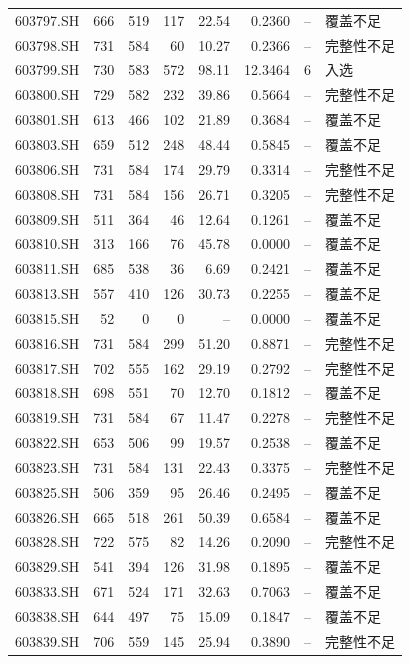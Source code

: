 \documentclass[10pt,a4paper]{article}
\begin{document}
\begin{longtable}{lrrr r r r l}
603797.SH & 666 & 519 & 117 & 22.54 & 0.2360 & -- & 覆盖不足\\
603798.SH & 731 & 584 & 60 & 10.27 & 0.2366 & -- & 完整性不足\\
603799.SH & 730 & 583 & 572 & 98.11 & 12.3464 & 6 & 入选\\
603800.SH & 729 & 582 & 232 & 39.86 & 0.5664 & -- & 完整性不足\\
603801.SH & 613 & 466 & 102 & 21.89 & 0.3684 & -- & 覆盖不足\\
603803.SH & 659 & 512 & 248 & 48.44 & 0.5845 & -- & 覆盖不足\\
603806.SH & 731 & 584 & 174 & 29.79 & 0.3314 & -- & 完整性不足\\
603808.SH & 731 & 584 & 156 & 26.71 & 0.3205 & -- & 完整性不足\\
603809.SH & 511 & 364 & 46 & 12.64 & 0.1261 & -- & 覆盖不足\\
603810.SH & 313 & 166 & 76 & 45.78 & 0.0000 & -- & 覆盖不足\\
603811.SH & 685 & 538 & 36 & 6.69 & 0.2421 & -- & 覆盖不足\\
603813.SH & 557 & 410 & 126 & 30.73 & 0.2255 & -- & 覆盖不足\\
603815.SH & 52 & 0 & 0 & -- & 0.0000 & -- & 覆盖不足\\
603816.SH & 731 & 584 & 299 & 51.20 & 0.8871 & -- & 完整性不足\\
603817.SH & 702 & 555 & 162 & 29.19 & 0.2792 & -- & 完整性不足\\
603818.SH & 698 & 551 & 70 & 12.70 & 0.1812 & -- & 覆盖不足\\
603819.SH & 731 & 584 & 67 & 11.47 & 0.2278 & -- & 完整性不足\\
603822.SH & 653 & 506 & 99 & 19.57 & 0.2538 & -- & 覆盖不足\\
603823.SH & 731 & 584 & 131 & 22.43 & 0.3375 & -- & 完整性不足\\
603825.SH & 506 & 359 & 95 & 26.46 & 0.2495 & -- & 覆盖不足\\
603826.SH & 665 & 518 & 261 & 50.39 & 0.6584 & -- & 覆盖不足\\
603828.SH & 722 & 575 & 82 & 14.26 & 0.2090 & -- & 完整性不足\\
603829.SH & 541 & 394 & 126 & 31.98 & 0.1895 & -- & 覆盖不足\\
603833.SH & 671 & 524 & 171 & 32.63 & 0.7063 & -- & 覆盖不足\\
603838.SH & 644 & 497 & 75 & 15.09 & 0.1847 & -- & 覆盖不足\\
603839.SH & 706 & 559 & 145 & 25.94 & 0.3890 & -- & 完整性不足\\

\end{longtable}
\end{document}
